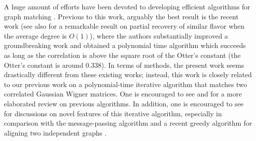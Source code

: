 \documentclass[11pt]{article}
\numberwithin{equation}{section}
\begin{document}
A huge amount of efforts have been devoted to developing efficient algorithms for graph matching \cite{PG11, YG13, LFP14, KHG15, FQRM+16, SGE17, BCL19, DMWX21, FMWX22a, FMWX22b, BSH19, CKMP19,DCKG19, MX20,  GM20, MRT21+, MWXY21+, GMS22+, MWXY22+}. Previous to this work, arguably the best result is the recent work \cite{MWXY22+} (see also \cite{GMS22+} for a remarkable result on partial recovery of similar flavor when the average degree is $O(1)$), where the authors substantially improved a groundbreaking work \cite{MRT21+} and obtained a polynomial time algorithm which succeeds as long as the correlation is above the square root of the Otter's constant (the Otter's constant is around ${0.338}$). In terms of methods, the present work seems drastically different from these existing works; instead, this work is closely related to our previous work \cite{DL22+} on a polynomial-time iterative algorithm that matches two correlated Gaussian Wigner matrices. One is encouraged to see \cite[Section 1.1]{MWXY22+} and \cite[Section 1.1]{DL22+} for a more elaborated review on previous algorithms. In addition, one is encouraged to see \cite[Section 1.2]{DL22+} for discussions on novel features of this iterative algorithm, especially in comparison with the message-passing algorithm \cite{GMS22+, PSSZ22} and a recent greedy algorithm for aligning two independent graphs \cite{DDG22+}. 
\end{document}

